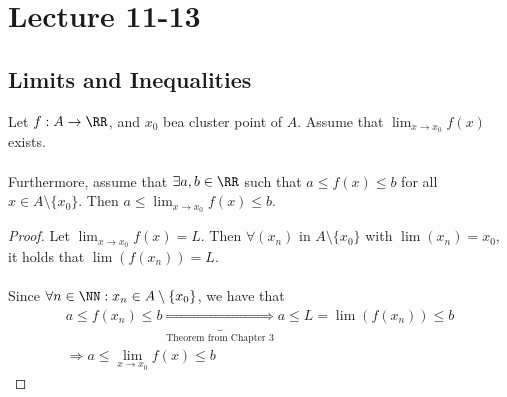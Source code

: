 \documentclass[class=scrartcl, crop=false]{standalone}
\date{2019-11-13}
\begin{document}
\section{Lecture 11-13}

\subsection{Limits and Inequalities}

\begin{theorem}
  Let $f: A \to \RR$, and $x_0$ bea cluster point of $A$. Assume that $\lim_{x \to x_0}f(x)$ exists.
  \\\\
  Furthermore, assume that $\exists a, b \in \RR$ such that $a \leq f(x) \leq b$ for all $x \in A \setminus \{x_0\}$. Then $a \leq \lim_{x \to x_0} f(x) \leq b$.
  \begin{proof}
    Let $\lim_{x \to x_0} f(x) = L$. Then $\forall (x_n)$ in $A \setminus \{x_0\}$ with $\lim(x_n) = x_0$, it holds that $\lim(f(x_n)) = L$.
    \\\\
    Since $\forall n \in \NN : x_n \in A \setminus \{x_0\}$, we have that 
    \begin{gather*}
      a \leq f(x_n) \leq b \underbrace{\Rightarrow}_{\text{Theorem from Chapter 3}} a \leq L = \lim(f(x_n)) \leq b
      \\
      \Rightarrow a \leq \lim_{x \to x_0} f(x) \leq b
    \end{gather*}
  \end{proof} 
\end{theorem} 
\end{document}
